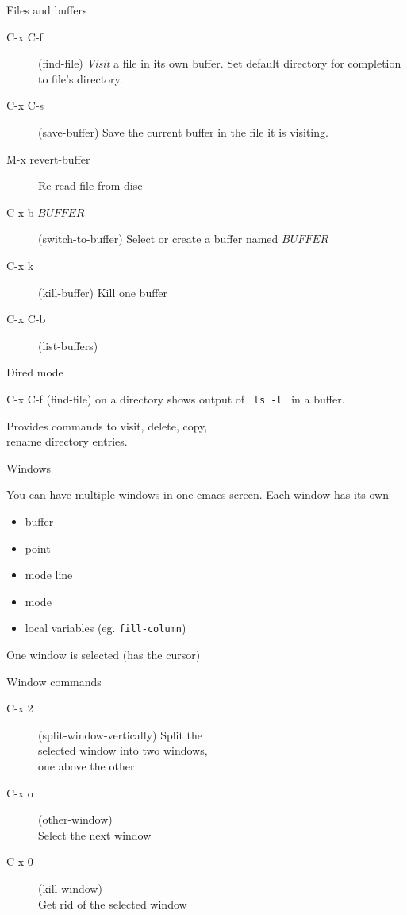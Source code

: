 \begin{slide}{}
Files and buffers
\begin{description}
\item[C-x C-f]
(find-file) {\em Visit} a file in its own
buffer.  Set default directory for completion to file's directory.
\item[C-x C-s]
(save-buffer) Save the current buffer in the file it is visiting.
\item[M-x revert-buffer]
Re-read file from disc

\item[C-x b $BUFFER$]
(switch-to-buffer) Select or create a buffer named $BUFFER$
\item[C-x k]
(kill-buffer) Kill one buffer
\item[C-x C-b]
(list-buffers)
\end{description}
\end{slide}

\begin{slide}{}
Dired mode
\vspace{3cm}

C-x C-f (find-file) on a directory shows output of
\ {\tt ls -l} \ in a buffer.

Provides commands to visit, delete, copy, \\
rename directory entries.
\end{slide}

\begin{slide}{}
Windows

You can have multiple windows in one emacs screen.  Each window has
its own
\begin{itemize}
\item buffer
\item point
\item mode line
\item mode
\item local variables (eg. {\tt fill-column})
\end{itemize}
One window is selected (has the cursor)
\end{slide}

\begin{slide}{}
Window commands

\vspace{3cm}

\begin{description}
\item[C-x 2]
(split-window-vertically) Split the \\
selected window into two windows, \\
one above the other
\item[C-x o]
(other-window) \\
Select the next window
\item[C-x 0] (kill-window) \\
Get rid of the selected window
\end{description}
\end{slide}

